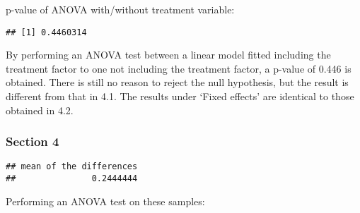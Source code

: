 \documentclass[]{article}
\newenvironment{Shaded}{\begin{snugshade}}{\end{snugshade}}
\newcommand{\KeywordTok}[1]{\textcolor[rgb]{0.13,0.29,0.53}{\textbf{#1}}}
\newcommand{\DataTypeTok}[1]{\textcolor[rgb]{0.13,0.29,0.53}{#1}}
\newcommand{\DecValTok}[1]{\textcolor[rgb]{0.00,0.00,0.81}{#1}}
\newcommand{\StringTok}[1]{\textcolor[rgb]{0.31,0.60,0.02}{#1}}
\newcommand{\OtherTok}[1]{\textcolor[rgb]{0.56,0.35,0.01}{#1}}
\newcommand{\OperatorTok}[1]{\textcolor[rgb]{0.81,0.36,0.00}{\textbf{#1}}}
\newcommand{\NormalTok}[1]{#1}
\begin{document}
p-value of ANOVA with/without treatment variable:

\begin{Shaded}
\end{Shaded}

\begin{verbatim}
## [1] 0.4460314
\end{verbatim}

By performing an ANOVA test between a linear model fitted including the
treatment factor to one not including the treatment factor, a p-value of
0.446 is obtained. There is still no reason to reject the null
hypothesis, but the result is different from that in 4.1. The results
under `Fixed effects' are identical to those obtained in 4.2.

\subsubsection{Section 4}\label{section-4-1}

\begin{Shaded}
\end{Shaded}

\begin{verbatim}
## mean of the differences 
##               0.2444444
\end{verbatim}

Performing an ANOVA test on these samples:

\begin{Shaded}
\end{Shaded}
\end{document}
